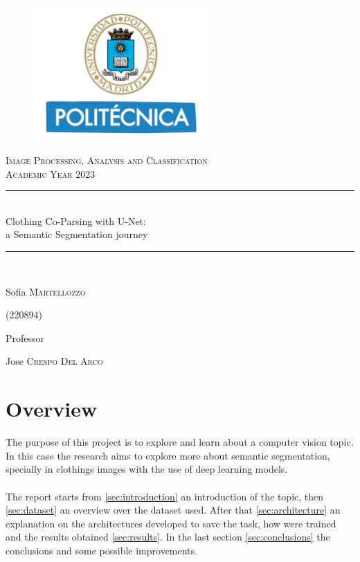 \documentclass{article}
\begin{document}
\begin{titlepage}
      \centering
      \begin{figure}
            \begin{center}
                  \includegraphics[width=0.6\textwidth]{img/UPM.png}
            \end{center}
      \end{figure}
      \vfill
      {\scshape\LARGE Image Processing, Analysis and Classification\\Academic Year 2023 \par}
      
      
      \vfill
      \newcommand{\HRule}{\rule{\linewidth}{0.3mm}}
      \centering
      \HRule \\[0.4cm]
      \huge  Clothing Co-Parsing with U-Net:\\
                a Semantic Segmentation journey\\%
      \HRule \\
      \vspace{1cm}
      {\Large Sofia \textsc{Martellozzo}\par}
      {\Large(220894)\par}
      \vfill
      {\large Professor\par
          Jose \textsc{Crespo Del Arco}}
\end{titlepage}


\newpage
\renewcommand\contentsname{Contents}
\tableofcontents

\newpage

\section*{Overview}
The purpose of this project is to explore and learn about a computer vision topic.\\ 
In this case the research aims to explore more about semantic segmentation, specially in clothings images with the use of deep learning models.\\\\
The report starts from \ref{sec:introduction} an introduction of the topic, then \ref{sec:dataset} an overview over the dataset used. After that \ref{sec:architecture} an explanation on the architectures developed to save the task, how were trained and the results obtained \ref{sec:results}. In the last section \ref{sec:conclusions} the conclusions and some possible improvements.
\end{document}
